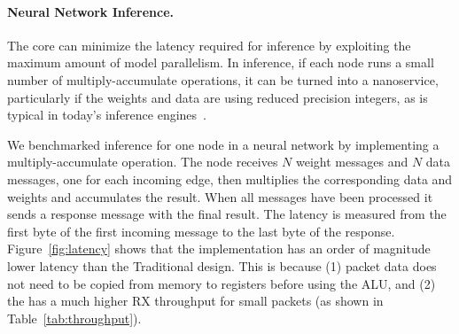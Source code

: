 

\paragraph{Neural Network Inference.} The \name{} core can minimize the latency required for inference by exploiting the maximum amount of model parallelism. In inference, if each node runs a small number of multiply-accumulate operations, it can be turned into a nanoservice, particularly if the weights and data are using reduced precision integers, as is typical in today's inference engines~\cite{tpu}.

We benchmarked inference for one node in a neural network by implementing a multiply-accumulate operation. The node receives $N$ weight messages and $N$ data messages, one for each incoming edge, then multiplies the corresponding data and weights and accumulates the result.
When all messages have been processed it sends a response message with the final result.
The latency is measured from the first byte of the first incoming message to the last byte of the response.
Figure~\ref{fig:latency} shows that the \name{} implementation has an order of magnitude lower latency than the Traditional design. 
This is because (1) packet data does not need to be copied from memory to registers before using the ALU, and (2) the \name{} has a much higher RX throughput for small packets (as shown in Table~\ref{tab:throughput}).

